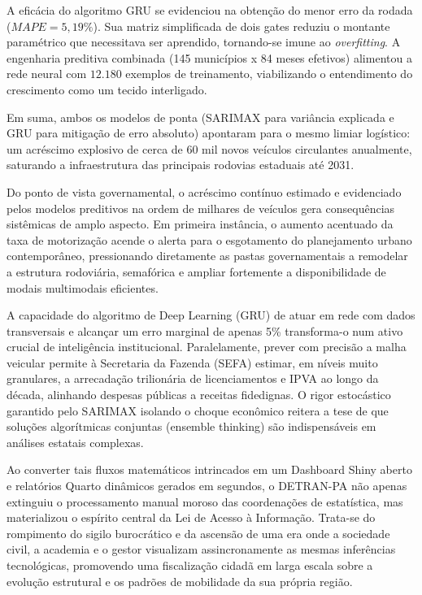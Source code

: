 \documentclass[12pt]{article}
\begin{document}
A eficácia do algoritmo GRU se evidenciou na obtenção do menor erro da rodada ($MAPE = 5,19\%$). Sua matriz simplificada de dois gates reduziu o montante paramétrico que necessitava ser aprendido, tornando-se imune ao \textit{overfitting}. A engenharia preditiva combinada (145 municípios x 84 meses efetivos) alimentou a rede neural com $12.180$ exemplos de treinamento, viabilizando o entendimento do crescimento como um tecido interligado. 

Em suma, ambos os modelos de ponta (SARIMAX para variância explicada e GRU para mitigação de erro absoluto) apontaram para o mesmo limiar logístico: um acréscimo explosivo de cerca de 60 mil novos veículos circulantes anualmente, saturando a infraestrutura das principais rodovias estaduais até 2031.




Do ponto de vista governamental, o acréscimo contínuo estimado e evidenciado pelos modelos preditivos na ordem de milhares de veículos gera consequências sistêmicas de amplo aspecto. Em primeira instância, o aumento acentuado da taxa de motorização acende o alerta para o esgotamento do planejamento urbano contemporâneo, pressionando diretamente as pastas governamentais a remodelar a estrutura rodoviária, semafórica e ampliar fortemente a disponibilidade de modais multimodais eficientes.

A capacidade do algoritmo de Deep Learning (GRU) de atuar em rede com dados transversais e alcançar um erro marginal de apenas 5\% transforma-o num ativo crucial de inteligência institucional. Paralelamente, prever com precisão a malha veicular permite à Secretaria da Fazenda (SEFA) estimar, em níveis muito granulares, a arrecadação trilionária de licenciamentos e IPVA ao longo da década, alinhando despesas públicas a receitas fidedignas. O rigor estocástico garantido pelo SARIMAX isolando o choque econômico reitera a tese de que soluções algorítmicas conjuntas (ensemble thinking) são indispensáveis em análises estatais complexas.

Ao converter tais fluxos matemáticos intrincados em um Dashboard Shiny aberto e relatórios Quarto dinâmicos gerados em segundos, o DETRAN-PA não apenas extinguiu o processamento manual moroso das coordenações de estatística, mas materializou o espírito central da Lei de Acesso à Informação. Trata-se do rompimento do sigilo burocrático e da ascensão de uma era onde a sociedade civil, a academia e o gestor visualizam assincronamente as mesmas inferências tecnológicas, promovendo uma fiscalização cidadã em larga escala sobre a evolução estrutural e os padrões de mobilidade da sua própria região.
\end{document}
